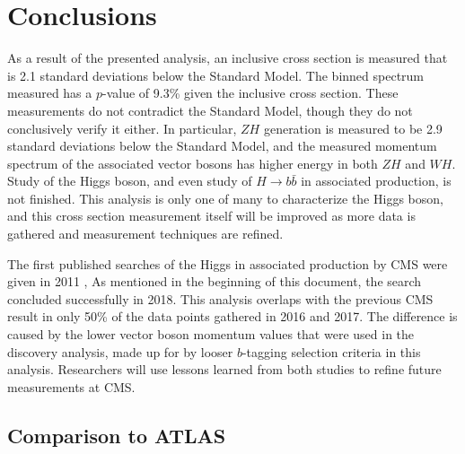 \chapter{Conclusions} \label{ch:conclusion}

As a result of the presented analysis,
an inclusive cross section is measured that is 2.1 standard deviations below the Standard Model.
The binned spectrum measured has a $p$-value of 9.3\% given the inclusive cross section.
These measurements do not contradict the Standard Model, though they do not conclusively verify it either.
In particular, $Z\!H$ generation is measured to be 2.9 standard deviations below the Standard Model,
and the measured momentum spectrum of the associated vector bosons has higher energy in both $Z\!H$ and $W\!H$.
Study of the Higgs boson, and even study of $H\rightarrow b\bar{b}$ in associated production, is not finished.
This analysis is only one of many to characterize the Higgs boson,
and this cross section measurement itself will be improved as more data is gathered
and measurement techniques are refined.

The first published searches of the Higgs in associated production by CMS
were given in 2011 \cite{CMS-PAS-HIG-11-012},
As mentioned in the beginning of this document, the search concluded successfully in 2018.
This analysis overlaps with the previous CMS result in only 50\% of the data points gathered in 2016 and 2017.
The difference is caused by the lower vector boson momentum values that were used in the discovery analysis,
made up for by looser $b$-tagging selection criteria in this analysis.
Researchers will use lessons learned from both studies to refine future measurements at CMS.

\section{Comparison to ATLAS}

